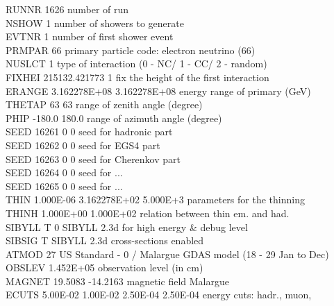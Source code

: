 \begingroup
  \selectfont 
  \noindent RUNNR  1626        \hfill number of run\\
  NSHOW  1            \hfill                          number of showers to generate\\
  EVTNR  1             \hfill                     number of first shower event\\
  PRMPAR 66           \hfill                primary particle code: electron neutrino (66)\\
NUSLCT 1               \hfill             type of interaction (0 - NC/ 1 - CC/ 2 - random)\\
FIXHEI 215132.421773 1   \hfill    fix the height of the first interaction\\
ERANGE 3.162278E+08 3.162278E+08  \hfill   energy range of primary (GeV)\\
THETAP 63 63         \hfill            range of zenith angle (degree)\\
PHIP   -180.0 180.0   \hfill     range of azimuth angle (degree)\\
SEED   16261 0 0     \hfill                        seed for hadronic part\\
SEED   16262 0 0      \hfill                       seed for EGS4 part\\
SEED   16263 0 0      \hfill                       seed for Cherenkov part\\
SEED   16264 0 0      \hfill                       seed for ...\\
SEED   16265 0 0       \hfill                      seed for ...\\
THIN   1.000E-06 3.162278E+02 5.000E+3   \hfill     parameters for the thinning\\
THINH  1.000E+00 1.000E+02     \hfill               relation between thin em. and had.\\
SIBYLL T 0        \hfill             SIBYLL 2.3d for high energy \& debug level\\
SIBSIG T         \hfill                             SIBYLL 2.3d cross-sections enabled\\
ATMOD   27       \hfill   US Standard - 0 / Malargue GDAS model (18 - 29 Jan to Dec)\\
OBSLEV  1.452E+05      \hfill                       observation level (in cm) \\
MAGNET   19.5083   -14.2163     \hfill    magnetic field Malargue  \\
ECUTS   5.00E-02 1.00E-02 2.50E-04 2.50E-04  \hfill  energy cuts: hadr., muon, \\ 
